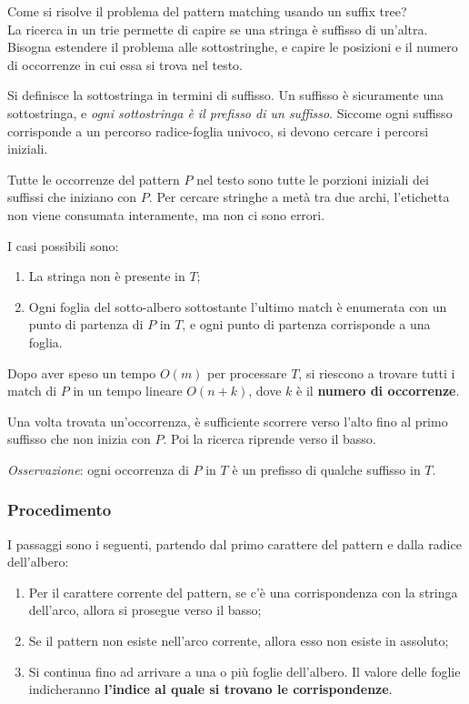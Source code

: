 Come si risolve il problema del pattern matching usando un suffix tree? \\
La ricerca in un trie permette di capire se una stringa è suffisso di un'altra. Bisogna estendere il problema alle sottostringhe, e capire le posizioni e il numero di occorrenze in cui essa si trova nel testo.

Si definisce la sottostringa in termini di suffisso. Un suffisso è sicuramente una sottostringa, e \textit{ogni sottostringa è il prefisso di un suffisso}. Siccome ogni suffisso corrisponde a un percorso radice-foglia univoco, si devono cercare i percorsi iniziali. 

Tutte le occorrenze del pattern $P$ nel testo sono tutte le porzioni iniziali dei suffissi che iniziano con $P$. Per cercare stringhe a metà tra due archi, l'etichetta non viene consumata interamente, ma non ci sono errori. 

I casi possibili sono:
\begin{enumerate}
	\item La stringa non è presente in $T$;
	\item Ogni foglia del sotto-albero sottostante l'ultimo match è enumerata con un punto di partenza di $P$ in $T$, e ogni punto di partenza corrisponde a una foglia.
\end{enumerate}

Dopo aver speso un tempo $O(m)$ per processare $T$, si riescono a trovare tutti i match di $P$ in un tempo lineare $O(n + k)$, dove $k$ è il \textbf{numero di occorrenze}.

Una volta trovata un'occorrenza, è sufficiente scorrere verso l'alto fino al primo suffisso che non inizia con $P$. Poi la ricerca riprende verso il basso.

\textit{Osservazione}: ogni occorrenza di $P$ in $T$ è un prefisso di qualche suffisso in $T$.

\subsubsection{Procedimento}
I passaggi sono i seguenti, partendo dal primo carattere del pattern e dalla radice dell'albero:
\begin{enumerate}
	\item Per il carattere corrente del pattern, se c'è una corrispondenza con la stringa dell'arco, allora si prosegue verso il basso;
	\item Se il pattern non esiste nell'arco corrente, allora esso non esiste in assoluto;
	\item Si continua fino ad arrivare a una o più foglie dell'albero. Il valore delle foglie indicheranno \textbf{l'indice al quale si trovano le corrispondenze}.
\end{enumerate}

